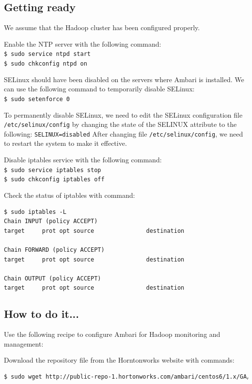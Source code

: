 \subsection*{Getting ready}
We assume that the Hadoop cluster has been configured properly.

Enable the NTP server with the following command: \\
\verb|$ sudo service ntpd start| \\
\verb|$ sudo chkconfig ntpd on|

SELinux should have been disabled on the servers where Ambari is installed. We can use the following command to temporarily disable SELinux: \\
\verb|$ sudo setenforce 0|

To permanently disable SELinux, we need to edit the SELinux configuration file \verb|/etc/selinux/config| by changing the state of the SELINUX attribute to the following:
\verb|SELINUX=disabled|
After changing file \verb|/etc/selinux/config|, we need to restart the system to make it effective.

Disable iptables service with the following command: \\
\verb|$ sudo service iptables stop| \\
\verb|$ sudo chkconfig iptables off|

Check the status of iptables with command: 
\lstset{style=bashstyle}
\begin{lstlisting}
$ sudo iptables -L
Chain INPUT (policy ACCEPT)
target     prot opt source               destination

Chain FORWARD (policy ACCEPT)
target     prot opt source               destination

Chain OUTPUT (policy ACCEPT)
target     prot opt source               destination
\end{lstlisting}

\subsection*{How to do it...}
Use the following recipe to configure Ambari for Hadoop monitoring and management:

Download the repository file from the Horntonworks website with commands:
\lstset{style=bashstyle}
\begin{lstlisting}[language=bash]
$ sudo wget http://public-repo-1.hortonworks.com/ambari/centos6/1.x/GA/ambari.repo -P /etc/yum.repos.d
\end{lstlisting}

